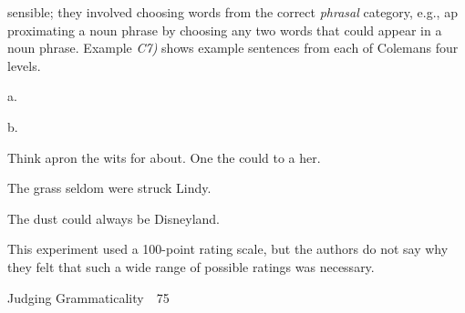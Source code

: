 \begin{styleStandard}
sensible; they involved choosing words from the correct \textit{phrasal}\textit{ }category, e.g., ap\- proximating a noun phrase by choosing any two words that could appear in a noun phrase. Example \textit{C}\textit{7)}\textit{ }shows example sentences from each of Coleman{\textquotesingle}s four levels.
\end{styleStandard}


\begin{multicols}{2}
\setcounter{listWWNumlleveli}{4}
\begin{listWWNumlleveli}
\item 
\begin{styleStandard}
a.
\end{styleStandard}


\end{listWWNumlleveli}
\begin{styleStandard}
b.
\end{styleStandard}


\begin{styleStandard}
Think apron the wits for about. One the could to a her.
\end{styleStandard}


\end{multicols}
\setcounter{listWWNumxlixleveli}{2}
\begin{listWWNumxlixleveli}
\item 
\begin{styleStandard}
The grass seldom were struck Lindy.
\end{styleStandard}


\item 
\begin{styleStandard}
The dust could always be Disneyland.
\end{styleStandard}


\end{listWWNumxlixleveli}
\setcounter{listWWNumlvleveli}{2}
\begin{listWWNumlvleveli}
\item 
\setcounter{listWWNumlvlevelii}{1}
\begin{listWWNumlvlevelii}
\item 
\setcounter{listWWNumlvleveliii}{0}
\begin{listWWNumlvleveliii}
\item 
\begin{styleStandard}
This experiment used a 100-point rating scale, but the authors do not say why they felt that such a wide range of possible ratings was necessary.
\end{styleStandard}


\end{listWWNumlvleveliii}
\end{listWWNumlvlevelii}
\end{listWWNumlvleveli}
\clearpage\setcounter{page}{1}\begin{styleStandard}
Judging Grammaticality\ \ 75
\end{styleStandard}


